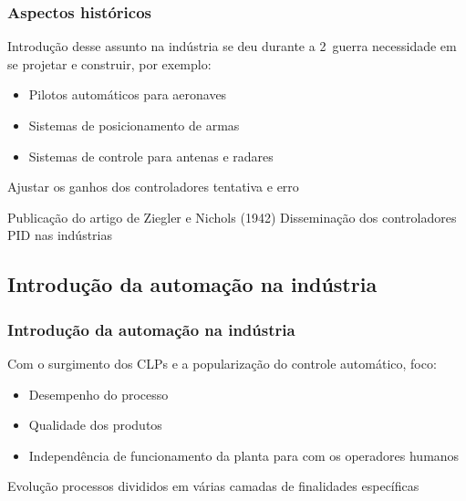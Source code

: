 \documentclass{beamer}
\begin{document}
\begin{frame}
    \frametitle{Aspectos históricos}

    Introdução desse assunto na indústria se deu durante a 2\textordfeminine\
    guerra \implica necessidade em se projetar e construir, por exemplo:

\begin{itemize}
    \item Pilotos automáticos para aeronaves
    \item Sistemas de posicionamento de armas
    \item Sistemas de controle para antenas e radares
\end{itemize}

    Ajustar os ganhos dos controladores \implica tentativa e erro

    \vspace{0.25cm}

    Publicação do artigo de Ziegler e Nichols (1942) \implica Disseminação dos
    controladores PID nas indústrias
\end{frame}

\subsection{Introdução da automação na indústria}
\begin{frame}
    \frametitle{Introdução da automação na indústria}

    Com o surgimento dos CLPs e a popularização do controle automático, foco:

\begin{itemize}
    \item Desempenho do processo
    \item Qualidade dos produtos 
    \item Independência de funcionamento da planta para com os operadores
          humanos
\end{itemize}

    Evolução \implica processos divididos em várias camadas de finalidades
    específicas
    
\end{frame}
\end{document}
